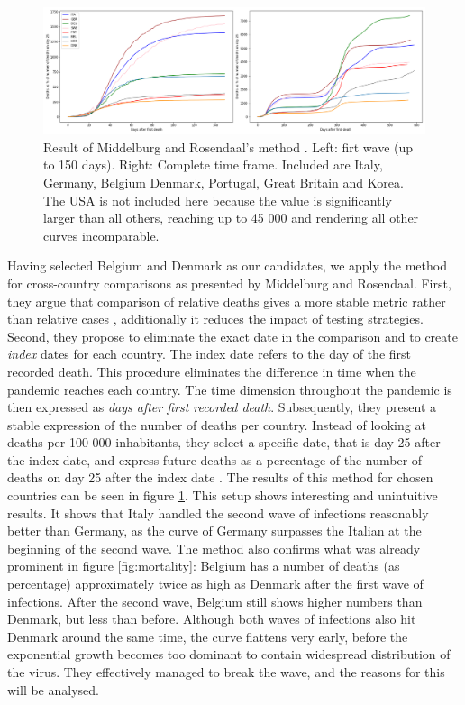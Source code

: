 \documentclass[a4paper,11pt]{article}
\begin{document}
\begin{figure}[htb]
    \centering
    \includegraphics[width=\textwidth]{figures/deaths_combined_2plot.png}
    \caption{Result of Middelburg and Rosendaal's method \cite{middelburg2020covid}. Left: firt wave (up to 150 days). Right: Complete time frame. Included are Italy, Germany, Belgium Denmark, Portugal, Great Britain and Korea. The USA is not included here because the value is significantly larger than all others, reaching up to 45 000 and rendering all other curves incomparable.}
    \label{fig:deaths_all}
\end{figure}

Having selected Belgium and Denmark as our candidates, we apply the method for cross-country comparisons as presented by
Middelburg and Rosendaal. First, they argue that comparison of relative deaths gives a more stable metric rather than relative
cases \cite{middelburg2020covid}, additionally it reduces the impact of testing strategies. Second, they propose to eliminate the exact date in the comparison and to create \textit{index} dates for each country. The index date refers to the day of the first recorded death. This procedure eliminates the difference
in time when the pandemic reaches each country. The time dimension throughout the pandemic is then expressed as \textit{days after first recorded death}. Subsequently, they present a stable expression of the number of deaths per country. Instead of looking at deaths per 100 000 inhabitants, they select a specific date, that is day 25 after the index date, and express future deaths
as a percentage of the number of deaths on day 25 after the index date \cite{middelburg2020covid}.
The results of this method for chosen countries can be seen in figure \ref{fig:deaths_all}.
This setup shows interesting and unintuitive results. It shows that Italy handled the
second wave of infections reasonably better than Germany, as the curve of Germany surpasses the Italian at the beginning of the second wave. The method also confirms
what was already prominent in figure \ref{fig:mortality}: Belgium has a number of deaths (as percentage) approximately twice as high as Denmark after the first wave of infections. After the second wave, Belgium still shows higher numbers than Denmark, but less than before.
Although both waves of infections also hit Denmark around the same time, the curve flattens very early, before the exponential growth becomes too dominant to contain widespread distribution of the virus. They effectively managed to break the wave, and the reasons for this will be analysed.
\end{document}

